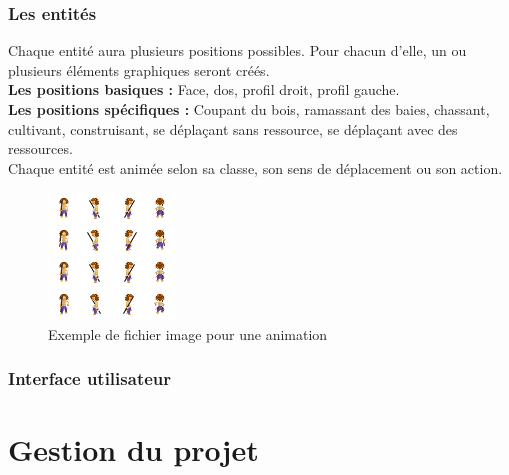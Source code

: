 \documentclass[a4paper]{memoir}
\begin{document}
			\subsection{Les entités}
				Chaque entité aura plusieurs positions possibles. Pour chacun d'elle, un ou plusieurs éléments graphiques seront créés.\\
				\textbf{Les positions basiques :} Face, dos, profil droit, profil gauche.\\
				\textbf{Les positions spécifiques :} Coupant du bois, ramassant des baies, chassant, cultivant, construisant, se déplaçant sans ressource, se déplaçant avec des ressources.\\
				Chaque entité est animée selon sa classe, son sens de déplacement ou son action.\\
				\begin{figure}[H]
					\begin{center}
						\includegraphics[scale=0.2]{img/animationSample.png}
					\end{center}
					\label{fig:animationSample}
					\caption{Exemple de fichier image pour une animation}
				\end{figure}
	
			\subsection{Interface utilisateur}
		
	\chapter{Gestion du projet}
\end{document}

